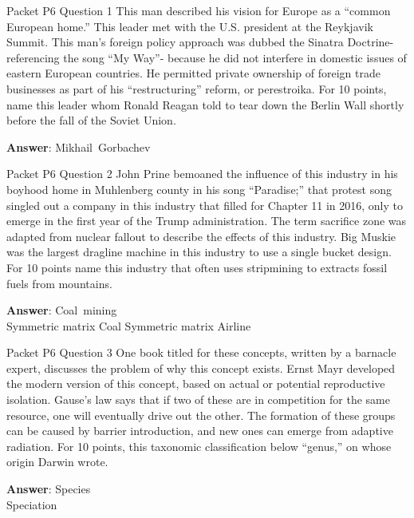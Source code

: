 \begin{frame}{Packet P6 Question 1}
This man described his vision for Europe as a “common European home.” This leader met with the U.S. president at the Reykjavik Summit. This man's foreign policy approach was dubbed the Sinatra Doctrine- referencing the song “My Way”- because he did not interfere in domestic issues of eastern European countries. He permitted private ownership of foreign trade businesses as part of his ``restructuring'' reform, or perestroika. For 10 points,     name this leader whom Ronald Reagan told   to tear down the Berlin Wall shortly before   the fall of the Soviet Union.

\textbf{Answer}: Mikhail\ Gorbachev\\
\end{frame}

\begin{frame}{Packet P6 Question 2}
John   Prine bemoaned the influence of this industry in his boyhood home in Muhlenberg county in his song “Paradise;” that protest song singled out a company in this industry that filled for Chapter 11 in 2016, only to emerge in the first year of the Trump administration.   The term sacrifice zone was adapted from nuclear fallout to describe the effects of this industry. Big Muskie was the largest dragline machine in this industry to use a single bucket design. For 10 points name this industry that often uses stripmining to extracts fossil fuels from mountains.      

\textbf{Answer}: Coal\ mining\\
 Symmetric matrix
 Coal
 Symmetric matrix
 Airline
\end{frame}

\begin{frame}{Packet P6 Question 3}
One book titled for these concepts, written by a barnacle expert, discusses the problem of why this concept exists. Ernst Mayr developed the modern version of this concept, based on actual or potential reproductive isolation.   Gause's law says that if two of these are in competition for the same resource, one will eventually drive out the other. The formation of these groups can be caused by barrier introduction, and new ones can emerge from adaptive radiation. For 10 points, this   taxonomic classification below ``genus,'' on whose origin Darwin       wrote.

\textbf{Answer}: Species\\
 Speciation
\end{frame}

